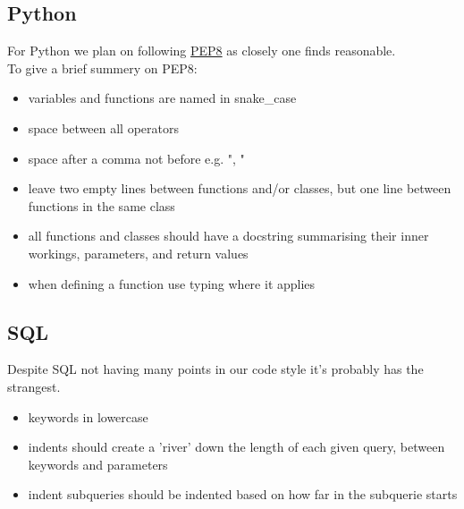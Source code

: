 \subsection{Python}
For Python we plan on following \href{https://peps.python.org/pep-0008/}{PEP8} as closely one finds reasonable.\\

To give a brief summery on PEP8:
\begin{itemize}
    \item variables and functions are named in snake\_case
    \item space between all operators
    \item space after a comma not before e.g. ", "
    \item leave two empty lines between functions and/or classes, but one line between functions in the same class
    \item all functions and classes should have a docstring summarising their inner workings, parameters, and return values
    \item when defining a function use typing where it applies
\end{itemize}

\subsection{SQL}
Despite SQL not having many points in our code style it's probably has the strangest.

\begin{itemize}
    \item keywords in lowercase
    \item indents should create a 'river' down the length of each given query, between keywords and parameters
    \item indent subqueries should be indented based on how far in the subquerie starts
\end{itemize}
